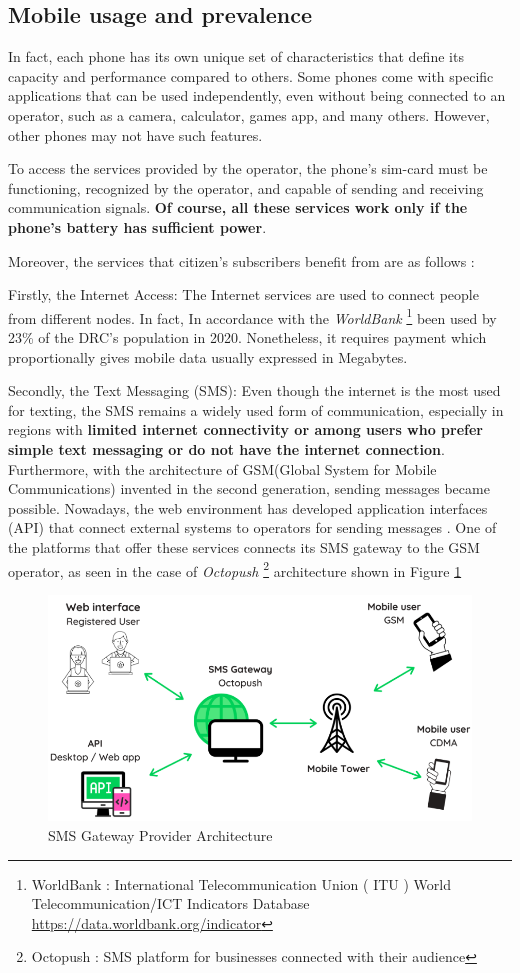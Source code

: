 \documentclass[12pt,a4paper]{report}
\begin{document}
\subsection{Mobile usage and prevalence} 
In fact, each phone has its own unique set of characteristics that define its capacity and performance compared to others. Some phones come with specific applications that can be used independently, even without being connected to an operator, such as a camera, calculator, games app, and many others. However, other phones may not have such features.

To access the services provided by the operator, the phone's sim-card must be functioning, recognized by the operator, and capable of sending and receiving communication signals. \textbf{Of course, all these services work only if the phone's battery has sufficient power}.

Moreover, the services that citizen's subscribers benefit from are as follows : 

Firstly, the Internet Access: The Internet services are used to connect people from different nodes. In fact, In accordance with the \textit{WorldBank} \footnote{WorldBank : International Telecommunication Union ( ITU ) World Telecommunication/ICT Indicators Database \url{https://data.worldbank.org/indicator}}  been used by 23\% of the DRC's population in 2020. Nonetheless, it requires payment which proportionally gives mobile data usually expressed in Megabytes. 

Secondly, the Text Messaging (SMS): Even though the internet is the most used for texting, the SMS remains a widely used form of communication, especially in regions with \textbf{limited internet connectivity or among users who prefer simple text messaging or do not have the internet connection}.
Furthermore, with the architecture of GSM(Global System for Mobile Communications) invented in the second generation, sending messages became possible. Nowadays, the web environment has developed application interfaces (API) that connect external systems to operators for sending messages \cite{hassinen2003secure}. One of the platforms that offer these services connects its SMS gateway to the GSM operator, as seen in the case of \textit{Octopush} \footnote{Octopush : SMS platform for businesses connected with their audience} architecture shown in Figure \ref{fig:smsgateway}  

\begin{figure}
	\centering
	\includegraphics[width=0.7\linewidth]{Images/SMSgateway}
	\caption{SMS Gateway Provider Architecture}
	\label{fig:smsgateway} 
\end{figure}
    
\end{document}
